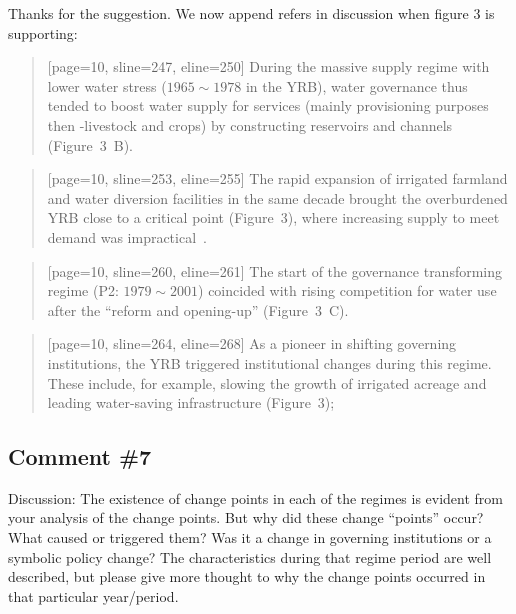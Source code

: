 \AR{} Thanks for the suggestion. We now append refers in discussion when figure 3 is supporting:

\begin{quote}[page=10, sline=247, eline=250]
    During the massive supply regime with lower water stress ($1965 \sim 1978$ in the YRB), water governance thus tended to boost water supply for services (mainly provisioning purposes then -livestock and crops) by constructing reservoirs and channels (Figure~3~B).
\end{quote}

\begin{quote}[page=10, sline=253, eline=255]
    The rapid expansion of irrigated farmland and water diversion facilities in the same decade brought the overburdened YRB close to a critical point (Figure~3), where increasing supply to meet demand was impractical~\cite{loch2020}.
\end{quote}

\begin{quote}[page=10, sline=260, eline=261]
    The start of the governance transforming regime (P2: $1979 \sim 2001$) coincided with rising competition for water use after the ``reform and opening-up'' (Figure~3~C).
\end{quote}

\begin{quote}[page=10, sline=264, eline=268]
    As a pioneer in shifting governing institutions, the YRB triggered institutional changes during this regime. These include, for example, slowing the growth of irrigated acreage and leading water-saving infrastructure (Figure~3);
\end{quote}

\subsection{Comment \#7}\label{sec:2-7}
\RC{} Discussion: The existence of change points in each of the regimes is evident from your analysis of the change points. But why did these change ``points'' occur? What caused or triggered them? Was it a change in governing institutions or a symbolic policy change? The characteristics during that regime period are well described, but please give more thought to why the change points occurred in that particular year/period.

